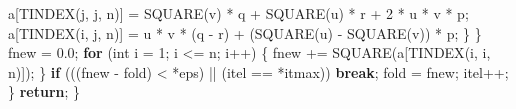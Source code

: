\documentclass[
  12pt,
  letterpaper,
  DIV=11,
  numbers=noendperiod]{scrreprt}
\newenvironment{Shaded}{\begin{snugshade}}{\end{snugshade}}
\newcommand{\ControlFlowTok}[1]{\textcolor[rgb]{0.00,0.23,0.31}{\textbf{#1}}}
\newcommand{\DataTypeTok}[1]{\textcolor[rgb]{0.68,0.00,0.00}{#1}}
\newcommand{\DecValTok}[1]{\textcolor[rgb]{0.68,0.00,0.00}{#1}}
\newcommand{\FloatTok}[1]{\textcolor[rgb]{0.68,0.00,0.00}{#1}}
\newcommand{\NormalTok}[1]{\textcolor[rgb]{0.00,0.23,0.31}{#1}}
\newcommand{\OperatorTok}[1]{\textcolor[rgb]{0.37,0.37,0.37}{#1}}
\theoremstyle{remark}
\begin{document}
\begin{Shaded}
\begin{Highlighting}[]
\NormalTok{                a}\OperatorTok{[}\NormalTok{TINDEX}\OperatorTok{(}\NormalTok{j}\OperatorTok{,}\NormalTok{ j}\OperatorTok{,}\NormalTok{ n}\OperatorTok{)]} \OperatorTok{=}
\NormalTok{                    SQUARE}\OperatorTok{(}\NormalTok{v}\OperatorTok{)} \OperatorTok{*}\NormalTok{ q }\OperatorTok{+}\NormalTok{ SQUARE}\OperatorTok{(}\NormalTok{u}\OperatorTok{)} \OperatorTok{*}\NormalTok{ r }\OperatorTok{+} \DecValTok{2} \OperatorTok{*}\NormalTok{ u }\OperatorTok{*}\NormalTok{ v }\OperatorTok{*}\NormalTok{ p}\OperatorTok{;}
\NormalTok{                a}\OperatorTok{[}\NormalTok{TINDEX}\OperatorTok{(}\NormalTok{i}\OperatorTok{,}\NormalTok{ j}\OperatorTok{,}\NormalTok{ n}\OperatorTok{)]} \OperatorTok{=}
\NormalTok{                    u }\OperatorTok{*}\NormalTok{ v }\OperatorTok{*} \OperatorTok{(}\NormalTok{q }\OperatorTok{{-}}\NormalTok{ r}\OperatorTok{)} \OperatorTok{+} \OperatorTok{(}\NormalTok{SQUARE}\OperatorTok{(}\NormalTok{u}\OperatorTok{)} \OperatorTok{{-}}\NormalTok{ SQUARE}\OperatorTok{(}\NormalTok{v}\OperatorTok{))} \OperatorTok{*}\NormalTok{ p}\OperatorTok{;}
            \OperatorTok{\}}
        \OperatorTok{\}}
\NormalTok{        fnew }\OperatorTok{=} \FloatTok{0.0}\OperatorTok{;}
        \ControlFlowTok{for} \OperatorTok{(}\DataTypeTok{int}\NormalTok{ i }\OperatorTok{=} \DecValTok{1}\OperatorTok{;}\NormalTok{ i }\OperatorTok{\textless{}=}\NormalTok{ n}\OperatorTok{;}\NormalTok{ i}\OperatorTok{++)} \OperatorTok{\{}
\NormalTok{            fnew }\OperatorTok{+=}\NormalTok{ SQUARE}\OperatorTok{(}\NormalTok{a}\OperatorTok{[}\NormalTok{TINDEX}\OperatorTok{(}\NormalTok{i}\OperatorTok{,}\NormalTok{ i}\OperatorTok{,}\NormalTok{ n}\OperatorTok{)]);}
        \OperatorTok{\}}
        \ControlFlowTok{if} \OperatorTok{(((}\NormalTok{fnew }\OperatorTok{{-}}\NormalTok{ fold}\OperatorTok{)} \OperatorTok{\textless{}} \OperatorTok{*}\NormalTok{eps}\OperatorTok{)} \OperatorTok{||} \OperatorTok{(}\NormalTok{itel }\OperatorTok{==} \OperatorTok{*}\NormalTok{itmax}\OperatorTok{))} \ControlFlowTok{break}\OperatorTok{;}
\NormalTok{        fold }\OperatorTok{=}\NormalTok{ fnew}\OperatorTok{;}
\NormalTok{        itel}\OperatorTok{++;}
    \OperatorTok{\}}
    \ControlFlowTok{return}\OperatorTok{;}
\OperatorTok{\}}


\end{Highlighting}
\end{Shaded}
\end{document}
